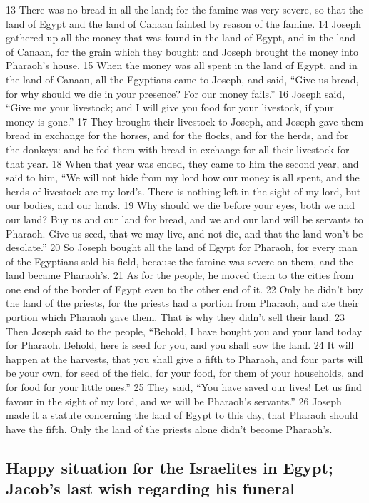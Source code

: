 {13} There was no bread in all the land; for the famine was very severe,
so that the land of Egypt and the land of Canaan fainted by reason of
the famine. {14} Joseph gathered up all the money that was found in the
land of Egypt, and in the land of Canaan, for the grain which they
bought: and Joseph brought the money into Pharaoh's house. {15} When the
money was all spent in the land of Egypt, and in the land of Canaan, all
the Egyptians came to Joseph, and said, ``Give us bread, for why should
we die in your presence? For our money fails.'' {16} Joseph said, ``Give
me your livestock; and I will give you food for your livestock, if your
money is gone.'' {17} They brought their livestock to Joseph, and Joseph
gave them bread in exchange for the horses, and for the flocks, and for
the herds, and for the donkeys: and he fed them with bread in exchange
for all their livestock for that year. {18} When that year was ended,
they came to him the second year, and said to him, ``We will not hide
from my lord how our money is all spent, and the herds of livestock are
my lord's. There is nothing left in the sight of my lord, but our
bodies, and our lands. {19} Why should we die before your eyes, both we
and our land? Buy us and our land for bread, and we and our land will be
servants to Pharaoh. Give us seed, that we may live, and not die, and
that the land won't be desolate.'' {20} So Joseph bought all the land of
Egypt for Pharaoh, for every man of the Egyptians sold his field,
because the famine was severe on them, and the land became Pharaoh's.
{21} As for the people, he moved them to the cities from one end of the
border of Egypt even to the other end of it. {22} Only he didn't buy the
land of the priests, for the priests had a portion from Pharaoh, and ate
their portion which Pharaoh gave them. That is why they didn't sell
their land. {23} Then Joseph said to the people, ``Behold, I have bought
you and your land today for Pharaoh. Behold, here is seed for you, and
you shall sow the land. {24} It will happen at the harvests, that you
shall give a fifth to Pharaoh, and four parts will be your own, for seed
of the field, for your food, for them of your households, and for food
for your little ones.'' {25} They said, ``You have saved our lives! Let
us find favour in the sight of my lord, and we will be Pharaoh's
servants.'' {26} Joseph made it a statute concerning the land of Egypt
to this day, that Pharaoh should have the fifth. Only the land of the
priests alone didn't become Pharaoh's.

\hypertarget{happy-situation-for-the-israelites-in-egypt-jacobs-last-wish-regarding-his-funeral}{%
\subsection{Happy situation for the Israelites in Egypt; Jacob's last
wish regarding his
funeral}\label{happy-situation-for-the-israelites-in-egypt-jacobs-last-wish-regarding-his-funeral}}

